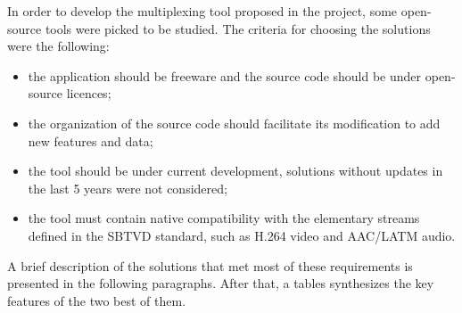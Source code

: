 \documentclass[
	12pt,				%
	openright,			%
	twoside,			%
	a4paper,			%
	brazil,
	french,				%
	english
	]{abntex2}
\begin{document}

In order to develop the multiplexing tool proposed in the project, some open-source tools were picked to be studied. The criteria for choosing the solutions were the following:
\begin{itemize}
\item{the application should be freeware and the source code should be under open-source licences;}
\item{the organization of the source code should facilitate its modification to add new features and data;}
\item{the tool should be under current development, solutions without updates in the last 5 years were not considered;}
\item{the tool must contain native compatibility with the elementary streams defined in the SBTVD standard, such as H.264 video and AAC/LATM audio.}
\end{itemize}

A brief description of the solutions that met most of these requirements is presented in the following paragraphs. After that, a tables synthesizes the key features of the two best of them.


\end{document}
